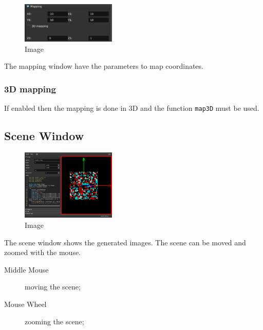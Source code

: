 \begin{figure}[h]
\centering
\includegraphics[width=0.4\textwidth]{imgs/main-mapping-0.png}
\caption{Image}\label{fig:main-mapping-0}
\end{figure}

The mapping window have the parameters to map coordinates.

\subsubsection{3D mapping}

If enabled then the mapping is done in 3D and the function \texttt{map3D} must be used.

\subsection{Scene Window}

\begin{figure}[h]
\centering
\includegraphics[width=0.4\textwidth]{imgs/main-scene-0.png}
\caption{Image}\label{fig:main-scene-0}
\end{figure}

The scene window shows the generated images. The scene can be moved and zoomed
with the mouse.

\begin{description}
\item[Middle Mouse] moving the scene;
\item[Mouse Wheel] zooming the scene;
\end{description}

